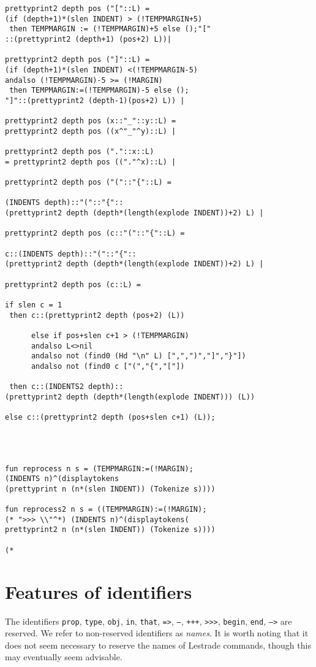 \documentclass[12pt]{article}
\begin{document}
\begin{verbatim}
prettyprint2 depth pos ("["::L) = 
(if (depth+1)*(slen INDENT) > (!TEMPMARGIN+5)
 then TEMPMARGIN := (!TEMPMARGIN)+5 else ();"[" 
::(prettyprint2 (depth+1) (pos+2) L))|

prettyprint2 depth pos ("]"::L) =
(if (depth+1)*(slen INDENT) <(!TEMPMARGIN-5)
andalso (!TEMPMARGIN)-5 >= (!MARGIN)
 then TEMPMARGIN:=(!TEMPMARGIN)-5 else (); 
"]"::(prettyprint2 (depth-1)(pos+2) L)) |

prettyprint2 depth pos (x::"_"::y::L) =
prettyprint2 depth pos ((x^"_"^y)::L) |

prettyprint2 depth pos ("."::x::L)
= prettyprint2 depth pos (("."^x)::L) |

prettyprint2 depth pos ("("::"{"::L) =

(INDENTS depth)::"("::"{"::
(prettyprint2 depth (depth*(length(explode INDENT))+2) L) |

prettyprint2 depth pos (c::"("::"{"::L) =

c::(INDENTS depth)::"("::"{"::
(prettyprint2 depth (depth*(length(explode INDENT))+2) L) |

prettyprint2 depth pos (c::L) = 

if slen c = 1
 then c::(prettyprint2 depth (pos+2) (L))

      else if pos+slen c+1 > (!TEMPMARGIN)
	  andalso L<>nil
	  andalso not (find0 (Hd "\n" L) [",",")","]","}"])
	  andalso not (find0 c ["(","{","["])
	  
 then c::(INDENTS2 depth)::
(prettyprint2 depth (depth*(length(explode INDENT))) (L))

else c::(prettyprint2 depth (pos+slen c+1) (L));




fun reprocess n s = (TEMPMARGIN:=(!MARGIN);
(INDENTS n)^(displaytokens
(prettyprint n (n*(slen INDENT)) (Tokenize s))))

fun reprocess2 n s = ((TEMPMARGIN):=(!MARGIN);
(* ">>> \\"^*) (INDENTS n)^(displaytokens(
prettyprint2 n (n*(slen INDENT)) (Tokenize s))))

(*

\end{verbatim}

\newpage

\section{Features of identifiers}

The identifiers {\tt prop}, {\tt type}, {\tt obj}, {\tt in}, {\tt that}, {\tt =>}, {\tt ---}, {\tt +++}, {\tt >>>}, {\tt begin}, {\tt end}, {\tt -->} are reserved.  We refer to non-reserved identifiers as {\em names}.  It is worth noting that it does not seem necessary to reserve the names of Lestrade commands, though this may eventually seem advisable.
\end{document}
